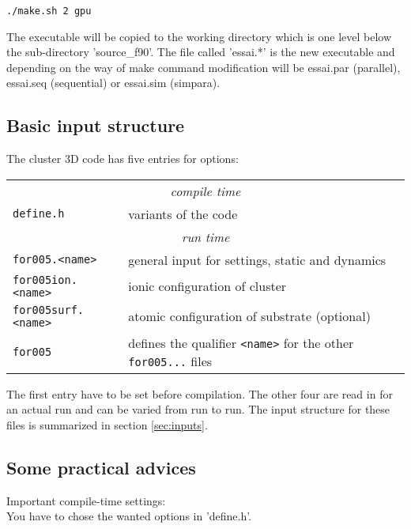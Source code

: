 \documentclass[12pt]{article}
\begin{document}
\begin{enumerate}
\begin{enumerate}
\hspace*{1cm}
{\tt ./make.sh 2 gpu} 
\end{enumerate}

The executable will be copied to the working
 directory which is one level below the sub-directory 'source\_f90'. The file called 'essai.*' is
 the new executable and depending on the way of make command modification will be essai.par (parallel),
 essai.seq (sequential) or 
 essai.sim (simpara).



\subsection{Basic input structure}
The cluster 3D code has five entries for options:
\\[-28pt]
\begin{center}
\begin{tabular}{ll}
\hline
\multicolumn{2}{c}{\it compile time}\\
 {\tt define.h} & variants of the code\\
\hline
\multicolumn{2}{c}{\it run time}\\
 {\tt for005.<name>} & general input for settings, static and
 dynamics\\
 {\tt for005ion.<name>} & ionic configuration of cluster\\
 {\tt for005surf.<name>} & atomic configuration of substrate (optional)\\
 {\tt for005} & defines the qualifier {\tt <name>} for 
                the other {\tt for005...} files\\
\hline
\end{tabular}
\end{center}
The first entry have to be set before compilation. The
other four are read in for an actual run and can be varied from
run to run. The input structure for these files is summarized
in section \ref{sec:inputs}.

\subsection{Some practical advices}

\begin{description}

 \item{Important compile-time settings:}\\
  You have to chose the wanted options in 'define.h'.


\end{description}
\end{enumerate}
\end{document}
